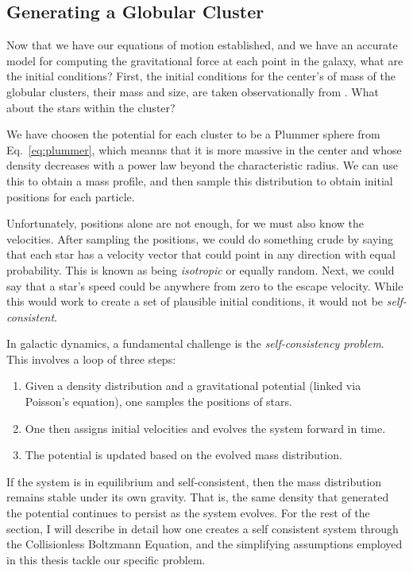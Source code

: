     
    \subsection{Generating a Globular Cluster}\label{subsec:initialconditions}

        Now that we have our equations of motion established, and we have an accurate model for computing the gravitational force at each point in the galaxy, what are the initial conditions? First, the initial conditions for the center's of mass of the globular clusters, their mass and size, are taken observationally from \citet{2018MNRAS.478.1520B}. What about the stars within the cluster? 

        We have choosen the potential for each cluster to be a Plummer sphere from Eq.~\ref{eq:plummer}, which meanns that it is more massive in the center and whose density decreases with a power law beyond the characteristic radius. We can use this to obtain a mass profile, and then sample this distribution to obtain initial positions for each particle. 

        Unfortunately, positions alone are not enough, for we must also know the velocities. After sampling the positions, we could do something crude by saying that each star has a velocity vector that could point in any direction with equal probability. This is known as being \textit{isotropic} or equally random. Next, we could say that a star's speed could be anywhere from zero to the escape velocity. While this would work to create a set of plausible initial conditions, it would not be \textit{self-consistent}. 

        In galactic dynamics, a fundamental challenge is the \textit{self-consistency problem}. This involves a loop of three steps:  
        \begin{enumerate}
            \item Given a density distribution and a gravitational potential (linked via Poisson's equation), one samples the positions of stars.  
            \item One then assigns initial velocities and evolves the system forward in time.  
            \item The potential is updated based on the evolved mass distribution.
        \end{enumerate}

        If the system is in equilibrium and self-consistent, then the mass distribution remains stable under its own gravity. That is, the same density that generated the potential continues to persist as the system evolves. For the rest of the section, I will describe in detail how one creates a self consistent system through the Collisionless Boltzmann Equation, and the simplifying assumptions employed in this thesis tackle our specific problem.

